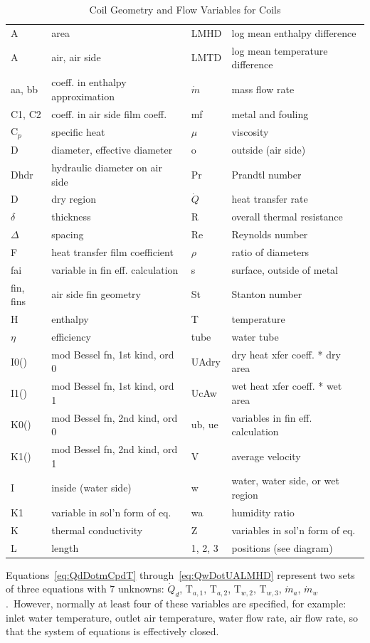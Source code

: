 \begin{longtable}[c]{|p{1.0in}p{2.0in}|p{1.0in}p{2.0in}|}
\caption{Coil Geometry and Flow Variables for Coils \label{table:coil-geometry-and-flow-variables-for-coils}} \tabularnewline
\toprule
\endfirsthead

\caption[]{Coil Geometry and Flow Variables for Coils} \tabularnewline
\toprule
\endhead

A & area & LMHD & log mean enthalpy difference \tabularnewline
A & air, air side & LMTD & log mean temperature difference \tabularnewline
aa, bb & coeff. in enthalpy approximation & $\dot m$ & mass flow rate \tabularnewline
C1, C2 & coeff. in air side film coeff. & mf & metal and fouling \tabularnewline
C\(_p\) & specific heat & $\mu$ & viscosity \tabularnewline
D & diameter, effective diameter & o & outside (air side) \tabularnewline
Dhdr & hydraulic diameter on air side & Pr & Prandtl number \tabularnewline
D & dry region & $\dot Q$ & heat transfer rate \tabularnewline
$\delta$ & thickness & R & overall thermal resistance \tabularnewline
$\Delta$ & spacing & Re & Reynolds number \tabularnewline
F & heat transfer film coefficient & $\rho$ & ratio of diameters \tabularnewline
fai & variable in fin eff. calculation & s & surface, outside of metal \tabularnewline
fin, fins & air side fin geometry & St & Stanton number \tabularnewline
H & enthalpy & T & temperature \tabularnewline
$\eta$ & efficiency & tube & water tube \tabularnewline
I0() & mod Bessel fn, 1st kind, ord 0 & UAdry & dry heat xfer coeff. * dry area \tabularnewline
I1() & mod Bessel fn, 1st kind, ord 1 & UcAw & wet heat xfer coeff. * wet area \tabularnewline
K0() & mod Bessel fn, 2nd kind, ord 0 & ub, ue & variables in fin eff. calculation \tabularnewline
K1() & mod Bessel fn, 2nd kind, ord 1 & V & average velocity \tabularnewline
I & inside (water side) & w & water, water side, or wet region \tabularnewline
K1 & variable in sol'n form of eq. & wa & humidity ratio \tabularnewline
K & thermal conductivity & Z & variables in sol'n form of eq. \tabularnewline
L & length & 1, 2, 3 & positions (see diagram) \tabularnewline
\bottomrule
\end{longtable}

Equations~\ref{eq:QdDotmCpdT} through~\ref{eq:QwDotUALMHD} represent two sets of three equations with 7 unknowns: \({\dot Q_d}\), T\(_{a,1}\), T\(_{a,2}\), T\(_{w,2}\), T\(_{w,3}\), \({\dot m_a}\), \({\dot m_w}\).~However, normally at least four of these variables are specified, for example: inlet water temperature, outlet air temperature, water flow rate, air flow rate, so that the system of equations is effectively closed.

